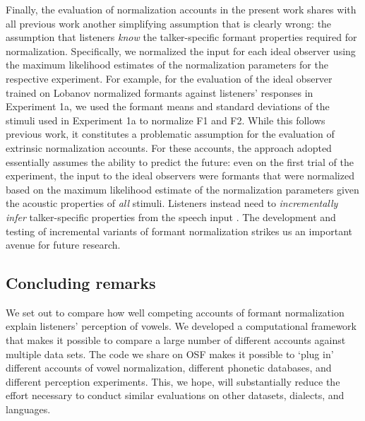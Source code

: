 \documentclass[preprint]{JASA}
\begin{document}
Finally, the evaluation of normalization accounts in the present work shares with all previous work \citep[e.g.,][]{apfelbaum-mcmurray2015, cole2010, mcmurray-jongman2011, barreda2021, nearey1989, richter2017} another simplifying assumption that is clearly wrong: the assumption that listeners \emph{know} the talker-specific formant properties required for normalization. Specifically, we normalized the input for each ideal observer using the maximum likelihood estimates of the normalization parameters for the respective experiment. For example, for the evaluation of the ideal observer trained on Lobanov normalized formants against listeners' responses in Experiment 1a, we used the formant means and standard deviations of the stimuli used in Experiment 1a to normalize F1 and F2. While this follows previous work, it constitutes a problematic assumption for the evaluation of extrinsic normalization accounts. For these accounts, the approach adopted essentially assumes the ability to predict the future: even on the first trial of the experiment, the input to the ideal observers were formants that were normalized based on the maximum likelihood estimate of the normalization parameters given the acoustic properties of \emph{all} stimuli. Listeners instead need to \emph{incrementally infer} talker-specific properties from the speech input \citep{nearey-assmann2007, xie2023}. The development and testing of incremental variants of formant normalization strikes us an important avenue for future research.

\subsection{Concluding remarks}\label{concluding-remarks}

We set out to compare how well competing accounts of formant normalization explain listeners' perception of vowels. We developed a computational framework that makes it possible to compare a large number of different accounts against multiple data sets. The code we share on OSF makes it possible to `plug in' different accounts of vowel normalization, different phonetic databases, and different perception experiments. This, we hope, will substantially reduce the effort necessary to conduct similar evaluations on other datasets, dialects, and languages.
\end{document}
